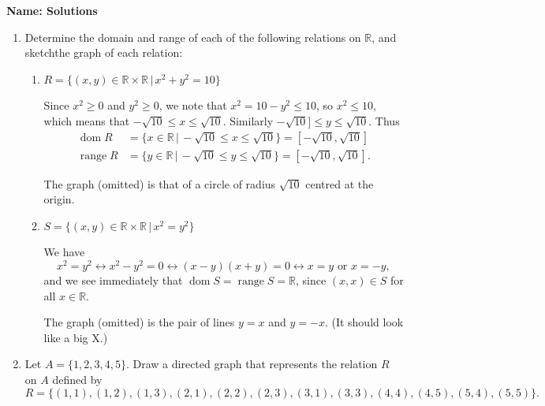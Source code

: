 \documentclass[12pt]{article}
\newcommand{\R}{\mathbb{R}}
\begin{document}
\thispagestyle{fancy}

\bigskip



{\bf Name: Solutions}

\bigskip

\begin{enumerate}
 \item Determine the domain and range of each of the following relations on $\R$, and sketchthe graph of each relation:

\begin{enumerate}
 \item $R=\{(x,y)\in\R\times\R\,|\, x^2+y^2=10\}$

\bigskip

Since $x^2\geq 0$ and $y^2\geq 0$, we note that $x^2=10-y^2\leq 10$, so $x^2\leq 10$, which means that $-\sqrt{10}\leq x\leq \sqrt{10}$. Similarly $-\sqrt{10}]\leq y\leq \sqrt{10}$. Thus
\begin{align*}
 \operatorname{dom}R &=\{x\in \R\,|\, -\sqrt{10}\leq x\leq \sqrt{10}\}= [-\sqrt{10},\sqrt{10}]\\
 \operatorname{range}R &=\{y\in\R\,|\, -\sqrt{10}\leq y\leq \sqrt{10}\} = [-\sqrt{10},\sqrt{10}].
\end{align*}

The graph (omitted) is that of a circle of radius $\sqrt{10}$ centred at the origin.

\item $S=\{(x,y)\in\R\times\R\,|\, x^2=y^2\}$

\bigskip

We have 
\[x^2=y^2 \leftrightarrow x^2-y^2=0\leftrightarrow (x-y)(x+y)=0 \leftrightarrow x=y \text{ or } x=-y,\]
and we see immediately that $\operatorname{dom}S=\operatorname{range}S=\R$, since $(x,x)\in S$ for all $x\in\R$.

The graph (omitted) is the pair of lines $y=x$ and $y=-x$. (It should look like a big X.)
\end{enumerate}

\item Let $A=\{1,2,3,4,5\}$. Draw a directed graph that represents the relation $R$ on $A$ defined by
\[
 R = \{(1,1),(1,2),(1,3),(2,1),(2,2),(2,3),(3,1),(3,3),(4,4),(4,5),(5,4),(5,5)\}.
\]

\bigskip



\end{enumerate}
\end{document}
